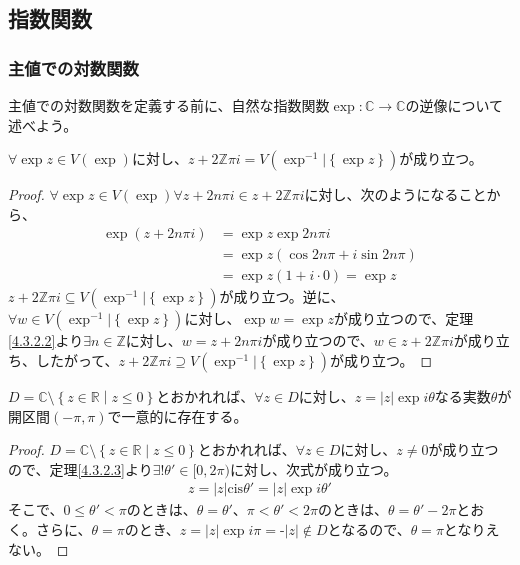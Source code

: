 \documentclass[dvipdfmx]{jsarticle}
\begin{document}
\subsection{指数関数}%
\subsubsection{主値での対数関数}%
主値での対数関数を定義する前に、自然な指数関数$\exp:\mathbb{C} \rightarrow \mathbb{C}$の逆像について述べよう。
\begin{thm}\label{4.3.3.1}
$\forall\exp z \in V\left( \exp \right)$に対し、$z + 2\mathbb{Z}\pi i = V\left( \exp^{- 1}|\left\{ \exp z \right\} \right)$が成り立つ。
\end{thm}
\begin{proof}
$\forall\exp z \in V\left( \exp \right)\forall z + 2n\pi i \in z + 2\mathbb{Z}\pi i$に対し、次のようになることから、
\begin{align*}
\exp(z + 2n\pi i) &= \exp z\exp{2n\pi i}\\
&= \exp z\left( \cos{2n\pi} + i\sin{2n\pi} \right)\\
&= \exp z(1 + i \cdot 0) = \exp z
\end{align*}
$z + 2\mathbb{Z}\pi i \subseteq V\left( \exp^{- 1}|\left\{ \exp z \right\} \right)$が成り立つ。逆に、$\forall w \in V\left( \exp^{- 1}|\left\{ \exp z \right\} \right)$に対し、$\exp w = \exp z$が成り立つので、定理\ref{4.3.2.2}より$\exists n \in \mathbb{Z}$に対し、$w = z + 2n\pi i$が成り立つので、$w \in z + 2\mathbb{Z}\pi i$が成り立ち、したがって、$z + 2\mathbb{Z}\pi i \supseteq V\left( \exp^{- 1}|\left\{ \exp z \right\} \right)$が成り立つ。
\end{proof}
\begin{thm}\label{4.3.3.2}
$D = \mathbb{C} \setminus \left\{ z \in \mathbb{R} \middle| z \leq 0 \right\}$とおかれれば、$\forall z \in D$に対し、$z = |z|\exp{i\theta}$なる実数$\theta$が開区間$( - \pi,\pi)$で一意的に存在する。
\end{thm}
\begin{proof}
$D = \mathbb{C} \setminus \left\{ z \in \mathbb{R} \middle| z \leq 0 \right\}$とおかれれば、$\forall z \in D$に対し、$z \neq 0$が成り立つので、定理\ref{4.3.2.3}より$\exists!\theta' \in [ 0,2\pi)$に対し、次式が成り立つ。
\begin{align*}
z = |z|\mathrm{cis}\theta' = |z|\exp{i\theta'}
\end{align*}
そこで、$0 \leq \theta' < \pi$のときは、$\theta = \theta'$、$\pi < \theta' < 2\pi$のときは、$\theta = \theta' - 2\pi$とおく。さらに、$\theta = \pi$のとき、$z = |z|\exp{i\pi} = \text{-}|z| \notin D$となるので、$\theta = \pi$となりえない。
\end{proof}\par
\end{document}
